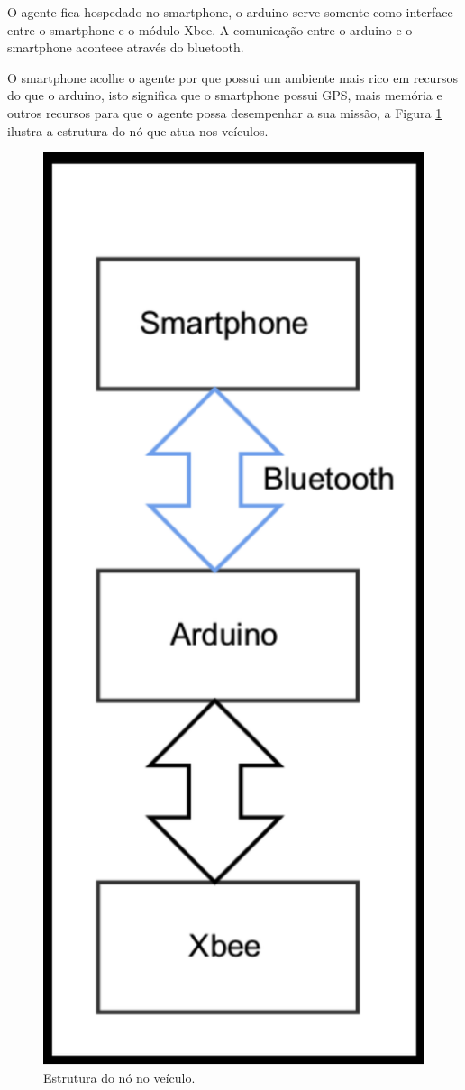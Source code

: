 O agente fica hospedado no smartphone, o arduino serve somente como interface entre o smartphone e o módulo Xbee. A comunicação entre o arduino e o smartphone acontece através do bluetooth. 

O smartphone acolhe o agente por que possui um ambiente mais rico em recursos do que o arduino, isto significa que o smartphone possui GPS, mais memória e outros recursos para que o agente possa desempenhar a sua missão, a Figura \ref{fig:arquiteturaPrototipoVeiculo} ilustra a estrutura do nó que atua nos veículos. 

\begin{figure}[htbp]
	\centering
	\includegraphics[scale=0.5]{metodologia/figuras/arquiteturaPrototipoVeiculo.pdf}
	\caption{Estrutura do nó no veículo.}
	\label{fig:arquiteturaPrototipoVeiculo}
\end{figure}

